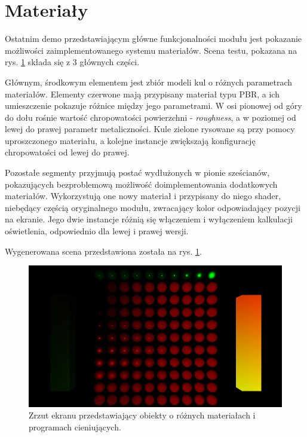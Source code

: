 \section{Materiały}
Ostatnim demo przedstawiającym główne funkcjonalności modułu jest pokazanie możliwości zaimplementowanego systemu materiałów. Scena testu, pokazana na rys. \ref{demo_materials} składa się z 3 głównych części.
 
Głównym, środkowym elementem jest zbiór modeli kul o różnych parametrach materiałów. Elementy czerwone mają przypisany materiał typu PBR, a ich umieszczenie pokazuje różnice między jego parametrami. W osi pionowej od góry do dołu rośnie wartość chropowatości powierzchni - \textit{roughness}, a w poziomej od lewej do prawej parametr metaliczności. Kule zielone rysowane są przy pomocy uproszczonego materiału, a kolejne instancje zwiększają konfigurację chropowatości od lewej do prawej. 

Pozostałe segmenty przyjmują postać wydłużonych w pionie sześcianów, pokazujących bezproblemową możliwość doimplementowania dodatkowych materiałów. Wykorzystują one nowy materiał i przypisany do niego shader, niebędący częścią oryginalnego modułu, zwracający kolor odpowiadający pozycji na ekranie. Jego dwie instancje różnią się włączeniem i wyłączeniem kalkulacji oświetlenia, odpowiednio dla lewej i prawej wersji. 

Wygenerowana scena przedstawiona została na rys. \ref{demo_materials}.

\begin{figure}[h!]
	\centering
	\includegraphics[width=\textwidth]{images/demo_materials.png}
	\caption{Zrzut ekranu przedstawiający obiekty o różnych materiałach i programach cieniujących.}
	\label{demo_materials}
\end{figure}
